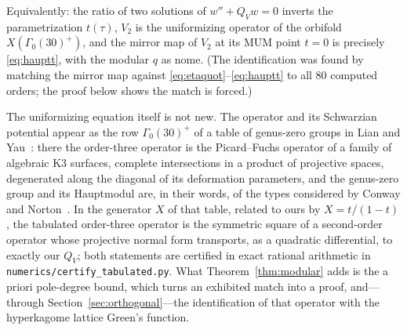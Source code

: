 \documentclass[cntp]{ipart}
\theoremstyle{plain}
\theoremstyle{remark}
\begin{document}
Equivalently: the ratio of two solutions of $w''+Q_Vw=0$ inverts the parametrization $t(\tau)$, $V_2$ is the
uniformizing operator of the orbifold $X(\Gamma_0(30)^+)$, and the mirror map of $V_2$ at its MUM point $t=0$
is precisely \eqref{eq:hauptt}, with the modular $q$ as nome. (The identification was found by matching the
mirror map against \eqref{eq:etaquot}--\eqref{eq:hauptt} to all $80$ computed orders; the proof below shows the
match is forced.)

The uniformizing equation itself is not new. The operator and its Schwarzian potential appear as
the row $\Gamma_0(30)^+$ of a table of genus-zero groups in Lian and Yau~\cite{LianYau1995}: there
the order-three operator is the Picard--Fuchs operator of a family of algebraic K3 surfaces,
complete intersections in a product of projective spaces, degenerated along the diagonal of its
deformation parameters, and the genus-zero group and its Hauptmodul are, in their words, of the
types considered by Conway and Norton~\cite{ConwayNorton1979}. In the generator $X$ of that table, related to ours by
$X=t/(1-t)$, the tabulated order-three operator is the symmetric square of a second-order operator
whose projective normal form transports, as a quadratic differential, to exactly our $Q_V$; both
statements are certified in exact rational arithmetic in
\texttt{numerics/\allowbreak certify\_\allowbreak tabulated.py}. What Theorem~\ref{thm:modular}
adds is the a priori pole-degree bound, which turns an exhibited match into a proof, and---through
Section~\ref{sec:orthogonal}---the identification of that operator with the hyperkagome lattice
Green's function.
\end{document}
